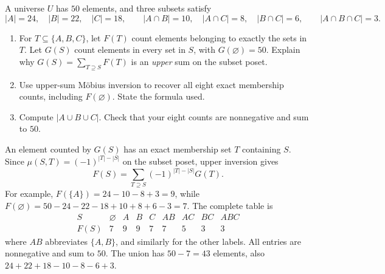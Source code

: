 A universe $U$ has $50$ elements, and three subsets satisfy
\[
 |A|=24,\quad |B|=22,\quad |C|=18,\qquad
 |A\cap B|=10,\quad |A\cap C|=8,\quad |B\cap C|=6,\qquad
 |A\cap B\cap C|=3.
\]
\begin{enumerate}
 \item For $T\subseteq\{A,B,C\}$, let $F(T)$ count elements belonging
 to exactly the sets in $T$. Let $G(S)$ count elements in every set in $S$,
 with $G(\varnothing)=50$. Explain why
 $G(S)=\sum_{T\supseteq S}F(T)$ is an \emph{upper} sum on the subset poset.
 \item Use upper-sum M\"obius inversion to recover all eight exact
 membership counts, including $F(\varnothing)$. State the formula used.
 \item Compute $|A\cup B\cup C|$. Check that your eight counts are
 nonnegative and sum to $50$. 
\end{enumerate}
\begin{solution}
An element counted by $G(S)$ has an exact membership set $T$ containing $S$.
Since $\mu(S,T)=(-1)^{|T|-|S|}$ on the subset poset, upper inversion gives
\[
 F(S)=\sum_{T\supseteq S}(-1)^{|T|-|S|}G(T).
\]
For example, $F(\{A\})=24-10-8+3=9$, while
$F(\varnothing)=50-24-22-18+10+8+6-3=7$.
The complete table is
\[
\begin{array}{c|rrrrrrrr}
 S&\varnothing&A&B&C&AB&AC&BC&ABC\\\hline
 F(S)&7&9&9&7&7&5&3&3
\end{array}
\]
where $AB$ abbreviates $\{A,B\}$, and similarly for the other labels.
All entries are nonnegative and sum to $50$.
The union has $50-7=43$ elements, also $24+22+18-10-8-6+3$.
\end{solution}

